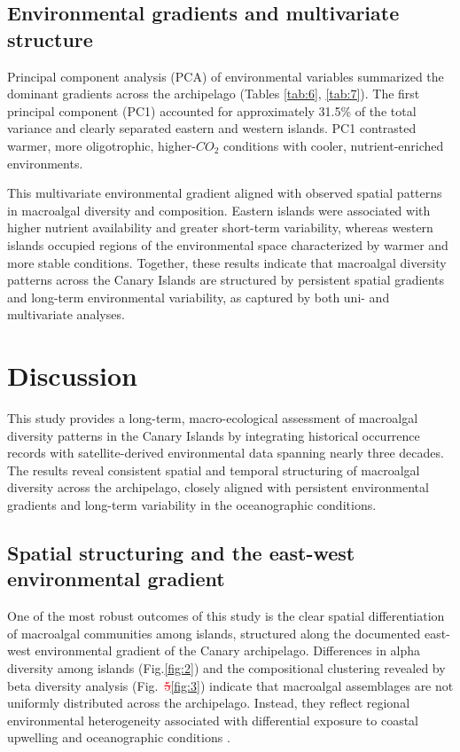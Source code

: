 \documentclass[a4paper,fleqn]{cas-sc}
\DeclareRobustCommand{\deleted}[1]{\textcolor{red}{\sout{#1}}}
\DeclareRobustCommand{\added}[1]{\textcolor{blue}{#1}}
\begin{document}
\subsection{Environmental gradients and multivariate structure}

Principal component analysis (PCA) of environmental variables summarized the dominant gradients across the archipelago (Tables \ref{tab:6}, \ref{tab:7}). The first principal component (PC1) accounted for approximately 31.5\% of the total variance and clearly separated eastern and western islands. PC1 contrasted warmer, more oligotrophic, higher-$CO_{2}$ conditions with cooler, nutrient-enriched environments.

This multivariate environmental gradient aligned with observed spatial patterns in macroalgal diversity and composition. Eastern islands were associated with higher nutrient availability and greater short-term variability, whereas western islands occupied regions of the environmental space characterized by warmer and more stable conditions. Together, these results indicate that macroalgal diversity patterns across the Canary Islands are structured by persistent spatial gradients and long-term environmental variability, as captured by both uni- and multivariate analyses.


\section{Discussion}

This study provides a long-term, macro-ecological assessment of macroalgal diversity patterns in the Canary Islands by integrating historical occurrence records with satellite-derived environmental data spanning nearly three decades. The results reveal consistent spatial and temporal structuring of macroalgal diversity across the archipelago, closely aligned with persistent environmental gradients and long-term variability in the oceanographic conditions.

\subsection{Spatial structuring and the east-west environmental gradient}

One of the most robust outcomes of this study is the clear spatial differentiation of macroalgal communities among islands, structured along the documented east-west environmental gradient of the Canary archipelago. Differences in alpha diversity among islands (Fig.\ref{fig:2}) and the compositional clustering revealed by beta diversity analysis (Fig.~\deleted{5}\added{\ref{fig:3}}) indicate that macroalgal assemblages are not uniformly distributed across the archipelago. Instead, they reflect regional environmental heterogeneity associated with differential exposure to coastal upwelling and oceanographic conditions \citep{Barton1998, Aristegui2009}.
\end{document}
